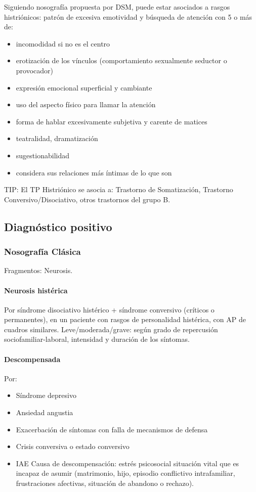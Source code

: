 \documentclass{scrbook}
\begin{document}
Siguiendo nosografía propuesta por DSM, puede estar asociados a rasgos histriónicos: patrón de excesiva emotividad y búsqueda de atención con 5 o más de:
\begin{itemize}
	\item incomodidad si no es el centro
	\item erotización de los vínculos (comportamiento sexualmente seductor o provocador)
	\item expresión emocional superficial y cambiante
	\item uso del aspecto físico para llamar la atención
	\item forma de hablar excesivamente subjetiva y carente de matices
	\item teatralidad, dramatización
	\item sugestionabilidad
	\item considera sus relaciones más íntimas de lo que son
\end{itemize}

TIP: El TP Histriónico se asocia a: Trastorno de Somatización, Trastorno Conversivo/Disociativo, otros trastornos del grupo B.

\subsection*{Diagnóstico positivo}
\subsubsection*{Nosografía Clásica}
\faPaste Fragmentos: Neurosis.
\paragraph{Neurosis histérica}
Por síndrome disociativo histérico + síndrome conversivo (críticos o permanentes), en un paciente con rasgos de personalidad histérica, con AP de cuadros similares. Leve/moderada/grave: según grado de repercusión sociofamiliar-laboral, intensidad y duración de los síntomas.

\paragraph{Descompensada}
Por:
\begin{itemize}
	\item Síndrome depresivo
	\item Ansiedad angustia
	\item Exacerbación de síntomas con falla de mecanismos de defensa
	\item Crisis conversiva o estado conversivo
	\item IAE Causa de descompensación: estrés psicosocial situación vital que es incapaz de asumir (matrimonio, hijo, episodio conflictivo intrafamiliar, frustraciones afectivas, situación de abandono o rechazo).
\end{itemize}
\end{document}
